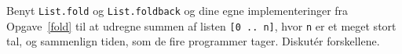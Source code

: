 Benyt \lstinline{List.fold} og \lstinline{List.foldback} og dine egne
implementeringer fra Opgave~\ref{fold} til at udregne summen af listen \lstinline{[0 .. n]}, hvor \lstinline{n} er et meget stort tal, og sammenlign tiden, som de fire programmer tager. Diskut\'{e}r forskellene.
